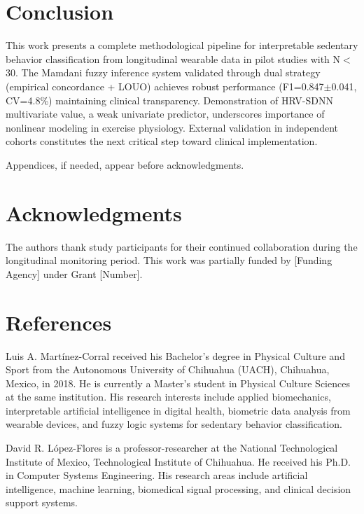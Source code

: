 \documentclass[journal,twoside,web]{ieeecolor}
\begin{document}
\section{Conclusion}
This work presents a complete methodological pipeline for interpretable sedentary behavior classification from longitudinal wearable data in pilot studies with N$<$30. The Mamdani fuzzy inference system validated through dual strategy (empirical concordance + LOUO) achieves robust performance (F1=0.847$\pm$0.041, CV=4.8\%) maintaining clinical transparency. Demonstration of HRV-SDNN multivariate value, a weak univariate predictor, underscores importance of nonlinear modeling in exercise physiology. External validation in independent cohorts constitutes the next critical step toward clinical implementation.

\appendices

Appendices, if needed, appear before acknowledgments.

\section*{Acknowledgments}

The authors thank study participants for their continued collaboration during the longitudinal monitoring period. This work was partially funded by [Funding Agency] under Grant [Number].

\section*{References}




\begin{IEEEbiographynophoto}{Luis A. Martínez-Corral} received his Bachelor's degree in Physical Culture and Sport from the Autonomous University of Chihuahua (UACH), Chihuahua, Mexico, in 2018. He is currently a Master's student in Physical Culture Sciences at the same institution. His research interests include applied biomechanics, interpretable artificial intelligence in digital health, biometric data analysis from wearable devices, and fuzzy logic systems for sedentary behavior classification.
\end{IEEEbiographynophoto}

\begin{IEEEbiographynophoto}{David R. López-Flores} is a professor-researcher at the National Technological Institute of Mexico, Technological Institute of Chihuahua. He received his Ph.D. in Computer Systems Engineering. His research areas include artificial intelligence, machine learning, biomedical signal processing, and clinical decision support systems.
\end{IEEEbiographynophoto}
\end{document}
